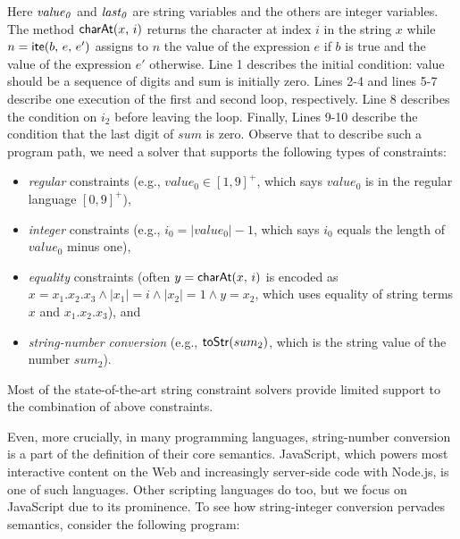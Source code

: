 \documentclass[sigplan,screen]{acmart}
\begin{document}
Here ${\it value_0}$ and ${\it last_0}$ are string variables and the others are integer variables. The method $\mbox{\textsf{charAt}($x$, $i$)}$ returns the character at index $i$ in the string $x$ while $n=\mbox{\textsf{ite}($b$, $e$, $e'$)}$ assigns to $n$ the value of the expression $e$ if $b$ is true and the value of the expression $e'$ otherwise. Line 1 describes the initial condition: \textsf{value} should be a sequence of digits and \textsf{sum} is initially zero. Lines 2-4 and lines 5-7 describe one execution of the first and second loop, respectively. Line 8 describes the condition on $i_2$ before leaving the loop. Finally, Lines 9-10 describe the condition that the last digit of $sum$ is zero. Observe that to describe such a program path, we need a solver that supports the following types of constraints:
\begin{itemize}
	\item \emph{regular} constraints (e.g., $value_0 \in [1,9]^+$, which says $value_0$ is in the regular language $[0,9]^+$),
	\item \emph{integer} constraints (e.g., $i_0 = |value_0| -1$, which says $i_0$ equals the length of $value_0$ minus one),
	\item \emph{equality} constraints (often $y=\mbox{\textsf{charAt}($x$, $i$)}$ is encoded as $x=x_1.x_2.x_3 \wedge |x_1| = i \wedge |x_2| =1 \wedge y= x_2$, which uses equality of string terms $x$ and $x_1.x_2.x_3$), and
	\item \emph{string-number conversion} (e.g., $\mbox{\textsf{toStr}($sum_2$)}$, which is the string value of the number $sum_2$).
\end{itemize}


Most of the state-of-the-art string constraint solvers provide limited support to the combination of above constraints.


Even, more crucially, in many programming languages, string-number conversion is a part of the definition of their core semantics. 
 JavaScript, which powers most interactive content on the Web and increasingly server-side code with Node.js, is one of such languages. Other scripting languages do too, but we focus on JavaScript due to its prominence. To see how string-integer conversion pervades semantics, consider the following program:
\end{document}
